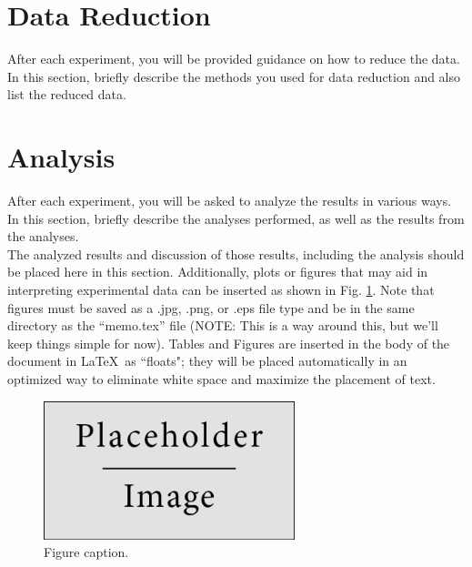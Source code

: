 \documentclass[12pt,letterpaper]{article}       %
\begin{document}
\section{Data Reduction}

After each experiment, you will be provided guidance on how to reduce the data. In this section, briefly describe the methods you used for data reduction and also list the reduced data.


\section{Analysis}

After each experiment, you will be asked to analyze the results in various ways. In this section, briefly describe the analyses performed, as well as the results from the analyses.\\ 

The analyzed results and discussion of those results, including the analysis should be placed here in this section. 
Additionally, plots or figures that may aid in interpreting experimental data can be inserted as shown in Fig. \ref{placeholderFigure}. Note that figures must be saved as a .jpg, .png, or .eps file type and be in the same directory as the ``memo.tex'' file (NOTE: This is a way around this, but we'll keep things simple for now).  
Tables and Figures are inserted in the body of the document in \LaTeX\ as ``floats"; they will be placed automatically in an optimized way to eliminate white space and maximize the placement of text.
\begin{figure}[h]
\begin{center}
	\includegraphics[width=0.65\textwidth]{placeholder} %
	\caption{Figure caption.}
	\label{placeholderFigure}
\end{center}
\end{figure}	
\end{document}
